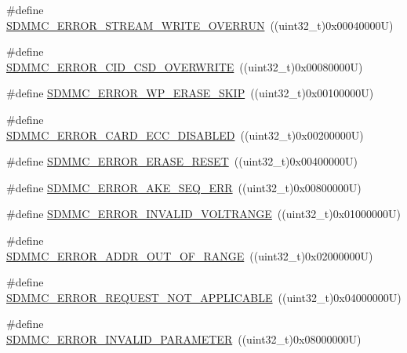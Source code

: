 \begin{DoxyCompactItemize}
\item 
\#define \mbox{\hyperlink{group___s_d_m_m_c___l_l___exported___constants_ga238c7da3692c3d3c3ff4643aa155a156}{S\+D\+M\+M\+C\+\_\+\+E\+R\+R\+O\+R\+\_\+\+S\+T\+R\+E\+A\+M\+\_\+\+W\+R\+I\+T\+E\+\_\+\+O\+V\+E\+R\+R\+UN}}~((uint32\+\_\+t)0x00040000\+U)
\item 
\#define \mbox{\hyperlink{group___s_d_m_m_c___l_l___exported___constants_gac9a9ffbca738f96faaee2ec338a9b96a}{S\+D\+M\+M\+C\+\_\+\+E\+R\+R\+O\+R\+\_\+\+C\+I\+D\+\_\+\+C\+S\+D\+\_\+\+O\+V\+E\+R\+W\+R\+I\+TE}}~((uint32\+\_\+t)0x00080000\+U)
\item 
\#define \mbox{\hyperlink{group___s_d_m_m_c___l_l___exported___constants_gaacd0740259204c9afa80cdb6d0dda218}{S\+D\+M\+M\+C\+\_\+\+E\+R\+R\+O\+R\+\_\+\+W\+P\+\_\+\+E\+R\+A\+S\+E\+\_\+\+S\+K\+IP}}~((uint32\+\_\+t)0x00100000\+U)
\item 
\#define \mbox{\hyperlink{group___s_d_m_m_c___l_l___exported___constants_ga60306ac146417b86487463d354d2a7cb}{S\+D\+M\+M\+C\+\_\+\+E\+R\+R\+O\+R\+\_\+\+C\+A\+R\+D\+\_\+\+E\+C\+C\+\_\+\+D\+I\+S\+A\+B\+L\+ED}}~((uint32\+\_\+t)0x00200000\+U)
\item 
\#define \mbox{\hyperlink{group___s_d_m_m_c___l_l___exported___constants_gaf208ed8aeffac72703c252a9b9cfd5c1}{S\+D\+M\+M\+C\+\_\+\+E\+R\+R\+O\+R\+\_\+\+E\+R\+A\+S\+E\+\_\+\+R\+E\+S\+ET}}~((uint32\+\_\+t)0x00400000\+U)
\item 
\#define \mbox{\hyperlink{group___s_d_m_m_c___l_l___exported___constants_gad7c5bc576a069a41207c7e89b556f1c7}{S\+D\+M\+M\+C\+\_\+\+E\+R\+R\+O\+R\+\_\+\+A\+K\+E\+\_\+\+S\+E\+Q\+\_\+\+E\+RR}}~((uint32\+\_\+t)0x00800000\+U)
\item 
\#define \mbox{\hyperlink{group___s_d_m_m_c___l_l___exported___constants_ga885fc3b11e0689bd43fecc74bc6b30ad}{S\+D\+M\+M\+C\+\_\+\+E\+R\+R\+O\+R\+\_\+\+I\+N\+V\+A\+L\+I\+D\+\_\+\+V\+O\+L\+T\+R\+A\+N\+GE}}~((uint32\+\_\+t)0x01000000\+U)
\item 
\#define \mbox{\hyperlink{group___s_d_m_m_c___l_l___exported___constants_gad0ef815d3f30eedca8e0c024f6f86726}{S\+D\+M\+M\+C\+\_\+\+E\+R\+R\+O\+R\+\_\+\+A\+D\+D\+R\+\_\+\+O\+U\+T\+\_\+\+O\+F\+\_\+\+R\+A\+N\+GE}}~((uint32\+\_\+t)0x02000000\+U)
\item 
\#define \mbox{\hyperlink{group___s_d_m_m_c___l_l___exported___constants_gab601fdfd912c272721bec53d91269447}{S\+D\+M\+M\+C\+\_\+\+E\+R\+R\+O\+R\+\_\+\+R\+E\+Q\+U\+E\+S\+T\+\_\+\+N\+O\+T\+\_\+\+A\+P\+P\+L\+I\+C\+A\+B\+LE}}~((uint32\+\_\+t)0x04000000\+U)
\item 
\#define \mbox{\hyperlink{group___s_d_m_m_c___l_l___exported___constants_gad2596da9045aa0fdd81330548c4e4ff4}{S\+D\+M\+M\+C\+\_\+\+E\+R\+R\+O\+R\+\_\+\+I\+N\+V\+A\+L\+I\+D\+\_\+\+P\+A\+R\+A\+M\+E\+T\+ER}}~((uint32\+\_\+t)0x08000000\+U)

\end{DoxyCompactItemize}
